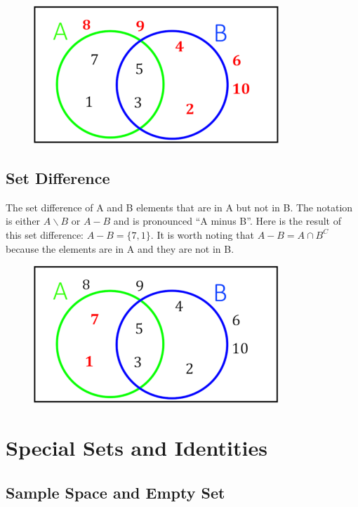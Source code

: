 \documentclass[]{book}
\begin{document}
\begin{figure}
\centering
\includegraphics{Pictures/01-Sets/AC.PNG}
\caption{}
\end{figure}

\subsection{Set Difference}\label{set-difference}

The set difference of A and B elements that are in A but not in B. The
notation is either \(A \backslash B\) or \(A - B\) and is pronounced ``A
minus B''. Here is the result of this set difference:
\(A - B = \{7,1\}\). It is worth noting that \(A-B=A \cap B^C\) because
the elements are in A and they are not in B.

\begin{figure}
\centering
\includegraphics{Pictures/01-Sets/A-B.PNG}
\caption{}
\end{figure}

\section{Special Sets and Identities}\label{special-sets-and-identities}

\subsection{Sample Space and Empty
Set}\label{sample-space-and-empty-set}
\end{document}
